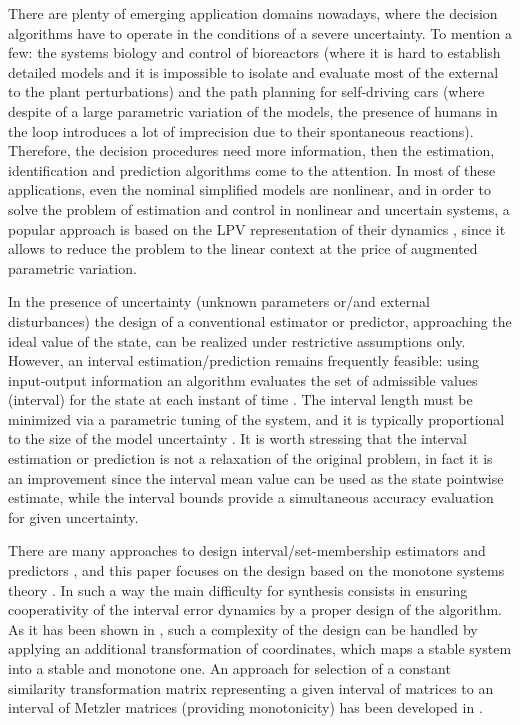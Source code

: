 \documentclass[twocolumn,english]{IEEEtran}
\theoremstyle{plain}
\theoremstyle{definition}
\theoremstyle{plain}
\theoremstyle{plain}
\theoremstyle{remark}
\begin{document}
There are plenty of emerging application domains nowadays, where the decision algorithms have to operate in the conditions of a severe uncertainty. To mention a few: the systems biology and control of bioreactors (where it is hard to establish detailed models and it is impossible to isolate and evaluate most of the external to the plant perturbations) and the path planning for self-driving cars (where despite of a large parametric variation of the models, the presence of humans in the loop introduces a lot of imprecision due to their spontaneous reactions). Therefore, the decision procedures need more information, then the estimation, identification and prediction algorithms come to the attention. In most of these applications, even the nominal simplified models are nonlinear, and in order to solve the problem of estimation and control in nonlinear and uncertain systems, a popular approach is based on the LPV representation of their dynamics \cite{Shamma2012,Marcos_Balas04,Shamma_Cloutier93,Tan97}, since it allows to reduce the problem to the linear context at the price of augmented parametric variation.

In the presence of uncertainty (unknown parameters or/and external disturbances) the design of a conventional estimator or predictor, approaching the ideal value of the state, can be realized under restrictive assumptions only. However, an interval estimation/prediction remains frequently feasible: using input-output information an algorithm evaluates the set of admissible values (interval) for the state at each instant of time \cite{Efimov2016,Raiessi2018}. The interval length must be minimized via a parametric tuning of the system, and it is typically proportional to the size of the model uncertainty \cite{Chebotarev2015}. It is worth stressing that the interval estimation or prediction is not a relaxation of the original problem, in fact it is an improvement since the interval mean value can be used as the state pointwise estimate, while the interval bounds provide a simultaneous accuracy evaluation for given uncertainty.

There are many approaches to design interval/set-membership estimators and predictors \cite{Jaulin02,Kieffer_Walter04,Bernard_Gouze04,Moisan_Bernard_Gouze09}, and this paper focuses on the design based on the monotone systems theory \cite{Bernard_Gouze04,Moisan_Bernard_Gouze09,RVZ10,REZ11,Efimov_a2012}.
In such a way the main difficulty for synthesis consists in ensuring cooperativity of the interval error dynamics by a proper design of the algorithm. As it has been shown in \cite{MazencBernard11,REZ11,Combastel2012}, such a complexity of the design can be handled by applying an additional transformation of coordinates, which maps a stable system into a stable and monotone one. An approach for selection of a constant similarity transformation matrix representing a given interval of matrices to an interval of Metzler matrices (providing monotonicity) has been developed in \cite{Efimov_a2013,Chebotarev2015}. 
\end{document}
